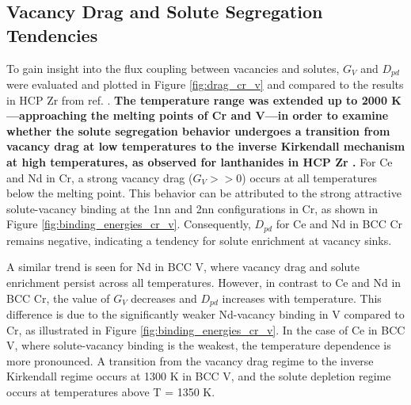 \documentclass[preprint,12pt]{elsarticle}
\providecommand{\DIFaddtex}[1]{{\bf #1}} %
\providecommand{\DIFaddbegin}{\protect\color{blue}} %
\providecommand{\DIFaddend}{\protect\color{black}} %
\providecommand{\DIFadd}[1]{\texorpdfstring{\DIFaddtex{#1}}{#1}} %
\newcommand{\DIFaddincludegraphics}[2][]{{\color{blue}\fbox{\DIFOincludegraphics[#1]{#2}}}} %
\DeclareRobustCommand{\DIFaddbegin}{\DIFOaddbegin \let\includegraphics\DIFaddincludegraphics} %
\DeclareRobustCommand{\DIFaddend}{\DIFOaddend \let\includegraphics\DIFOincludegraphics} %
\begin{document}
\DIFaddend \FloatBarrier
\subsection{Vacancy Drag and Solute Segregation Tendencies}
\label{section_drag_cr_v}

To gain insight into the flux coupling between vacancies and solutes, $G_V$ and $D_{pd}$ were evaluated and plotted in Figure \ref{fig:drag_cr_v} and compared to the results in HCP Zr from ref. \cite{shousha2024first}.
\DIFaddbegin \DIFadd{The temperature range was extended up to 2000 K—approaching the melting points of Cr and V—in order to examine whether the solute segregation behavior undergoes a transition from vacancy drag at low temperatures to the inverse Kirkendall mechanism at high temperatures, as observed for lanthanides in HCP Zr \cite{shousha2024first}.
}\DIFaddend For Ce and Nd in Cr, a strong vacancy drag ($G_V >> 0$) occurs at all temperatures below the melting point. This behavior can be attributed to the strong attractive solute-vacancy binding at the 1nn and 2nn configurations in Cr, as shown in Figure \ref{fig:binding_energies_cr_v}. Consequently, $D_{pd}$ for Ce and Nd in BCC Cr remains negative, indicating a tendency for solute enrichment at vacancy sinks.

A similar trend is seen for Nd in BCC V, where vacancy drag and solute enrichment persist across all temperatures. However, in contrast to Ce and Nd in BCC Cr, the value of $G_V$ decreases and $D_{pd}$ increases with temperature. This difference is due to the significantly weaker Nd-vacancy binding in V compared to Cr, as illustrated in Figure \ref{fig:binding_energies_cr_v}. In the case of Ce in BCC V, where solute-vacancy binding is the weakest, the temperature dependence is more pronounced. A transition from the vacancy drag regime to the inverse Kirkendall regime occurs at 1300 K in BCC V, and the solute depletion regime occurs at temperatures above T = 1350 K.
\end{document}
